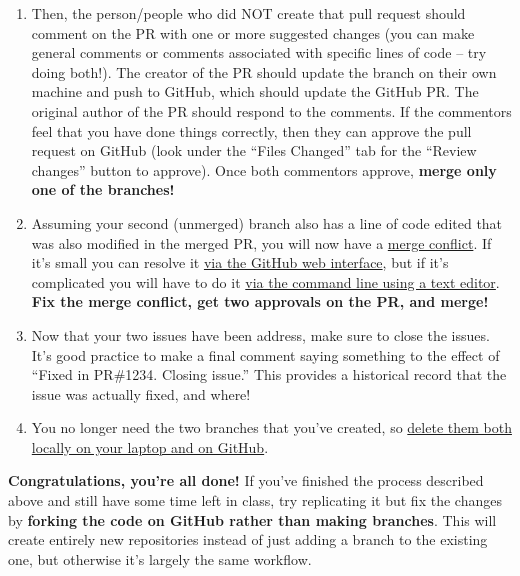 \documentclass[10pt]{article}
\begin{document}
\begin{enumerate}
\item Then, the person/people who did NOT create that pull request
  should comment on the PR with one or more suggested
  changes (you can make general comments or comments associated with
  specific lines of code -- try doing both!).  The creator of the PR should update the
  branch on their own machine and push to GitHub, which should update
  the GitHub PR.  The original author of the PR should respond to the comments.  If the commentors feel
  that you have done things correctly, then they can approve the pull
  request on GitHub (look under the ``Files Changed'' tab for the
  ``Review changes'' button to approve).  Once both commentors approve, \textbf{merge only one of
    the branches!}

 \item Assuming your second (unmerged) branch also has a line of code
   edited that was also modified in the merged PR, you will now have a
   \href{https://docs.github.com/en/pull-requests/collaborating-with-pull-requests/addressing-merge-conflicts/about-merge-conflicts}{merge
     conflict}.  If it's small you can resolve it
   \href{https://docs.github.com/en/pull-requests/collaborating-with-pull-requests/addressing-merge-conflicts/resolving-a-merge-conflict-on-github}{via
   the GitHub web interface}, but if it's complicated you will have to
 do it
 \href{https://docs.github.com/en/pull-requests/collaborating-with-pull-requests/addressing-merge-conflicts/resolving-a-merge-conflict-using-the-command-line}{via
 the command line using a text editor}.  \textbf{Fix the merge
 conflict, get two approvals on the PR, and merge!}

\item Now that your two issues have been address, make sure to close
  the issues.  It's good practice to make a final comment saying
  something to the effect of ``Fixed in PR\#1234.  Closing issue.''
  This provides a historical record that the issue was actually fixed,
  and where!

\item You no longer need the two branches that you've created, so
  \href{https://stackoverflow.com/questions/2003505/how-do-i-delete-a-git-branch-locally-and-remotely}{delete
    them both locally on your laptop and on GitHub}.  

\end{enumerate}



\noindent
\textbf{Congratulations, you're all done!}  If you've finished the
process described above and still have some time left in class, try
replicating it but fix the changes by \textbf{forking the code on
GitHub rather than making branches}.  This will create entirely new
repositories instead of just adding a branch to the existing one, but
otherwise it's largely the same workflow.
\end{document}
